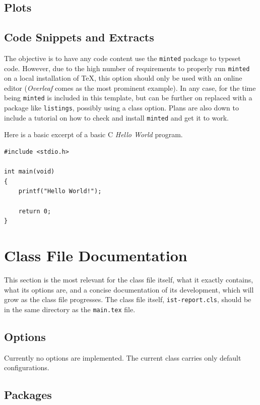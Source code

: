 \documentclass{ist-report}
\newcommand*{\package}[1]{\texttt{#1}}
\begin{document}
\subsection{Plots}

\subsection{Code Snippets and Extracts}

The objective is to have any code content use the \package{minted} package to typeset code. However, due to the high number of requirements to properly run \package{minted} on a local installation of \TeX{}, this option should only be used with an online editor (\textit{Overleaf} comes as the most prominent example). In any case, for the time being \package{minted} is included in this template, but can be further on replaced with a package like \package{listings}, possibly using a class option. Plans are also down to include a tutorial on how to check and install \package{minted} and get it to work.

Here is a basic excerpt of a basic C \textit{Hello World} program.
\begin{verbatim}
#include <stdio.h>

int main(void)
{
    printf("Hello World!");
    
    return 0;
}
\end{verbatim}

\section{Class File Documentation}

This section is the most relevant for the class file itself, what it exactly contains, what its options are, and a concise documentation of its development, which will grow as the class file progresses. The class file itself, \texttt{ist-report.cls}, should be in the same directory as the \texttt{main.tex} file.

\subsection{Options}

Currently no options are implemented. The current class carries only default configurations.

\subsection{Packages}
\end{document}
